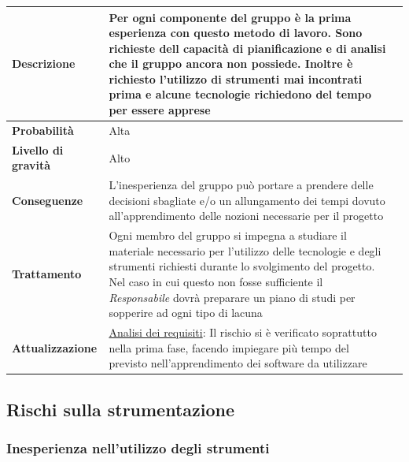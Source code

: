 \begin{center}
	
	\begin{tabular}{|>{\centering}m{4cm} ||>{\centering}m{8cm} |>{\centering\arraybackslash}m{0pt}@{}|}
		\hline
		\textbf{Descrizione} & Per ogni componente del gruppo è la
		prima esperienza con questo metodo di lavoro. Sono richieste dell
		capacità di pianificazione e di analisi che il gruppo ancora non
		possiede. Inoltre è richiesto l’utilizzo di strumenti mai
		incontrati prima e alcune tecnologie richiedono del tempo per
		essere apprese & \\[2ex]
		\hline	
		\textbf{Probabilità} & Alta &\\[1ex]
		\hline
		\textbf{Livello di gravità} & Alto & \\[1ex]
		\hline
		\textbf{Conseguenze} & L'inesperienza del gruppo può portare a prendere delle decisioni sbagliate e/o un allungamento dei tempi dovuto all'apprendimento delle nozioni necessarie per il progetto & \\[1ex]
		\hline
		\textbf{Trattamento} & Ogni membro del gruppo si impegna a
		studiare il materiale necessario per l’utilizzo delle tecnologie e
		degli strumenti richiesti durante lo svolgimento del progetto. Nel
		caso in cui questo non fosse sufficiente il  \emph{Responsabile}  dovrà
		preparare un piano di studi per sopperire ad ogni tipo di lacuna & \\[1ex] 
		\hline
		\textbf{Attualizzazione} & \underline{Analisi dei requisiti}: Il rischio si è verificato soprattutto nella prima fase, facendo
		impiegare più tempo del previsto nell’apprendimento dei software da utilizzare & \\[1ex]
		\hline
	\end{tabular}
	
\end{center}

\subsection{Rischi sulla strumentazione}
\subsubsection{Inesperienza nell'utilizzo degli strumenti}

